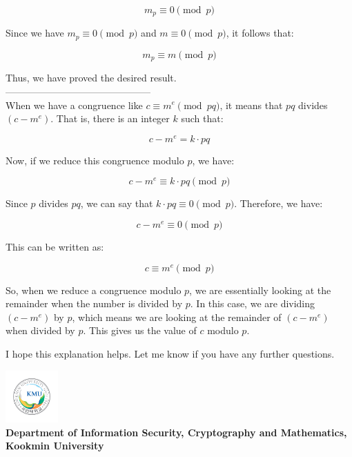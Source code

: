 \documentclass{article}
\newcommand{\footer}[1]{
\begin{flushright}
	\vspace{2em}
	\includegraphics[width=2cm]{school_logo.jpg} \\
	\vspace{1em}
	\textcolor{blue2}{\small\textbf{#1}}
\end{flushright}
}
\theoremstyle{definition}
\begin{document}
$$m_p \equiv 0 \pmod p$$

Since we have $m_p \equiv 0 \pmod p$ and $m \equiv 0 \pmod p$, it follows that:

$$m_p \equiv m \pmod p$$

Thus, we have proved the desired result.\\
---------------------------------------------\\
When we have a congruence like $c \equiv m^e \pmod{pq}$, it means that $pq$ divides $(c - m^e)$. That is, there is an integer $k$ such that:

$$c - m^e = k \cdot pq$$

Now, if we reduce this congruence modulo $p$, we have:

$$c - m^e \equiv k \cdot pq \pmod p$$

Since $p$ divides $pq$, we can say that $k \cdot pq \equiv 0 \pmod p$. Therefore, we have:

$$c - m^e \equiv 0 \pmod p$$

This can be written as:

$$c \equiv m^e \pmod p$$

So, when we reduce a congruence modulo $p$, we are essentially looking at the remainder when the number is divided by $p$. In this case, we are dividing $(c - m^e)$ by $p$, which means we are looking at the remainder of $(c - m^e)$ when divided by $p$. This gives us the value of $c$ modulo $p$.

I hope this explanation helps. Let me know if you have any further questions.
\newpage
\footer{Department of Information Security, Cryptography and Mathematics, Kookmin University}
\end{document}
